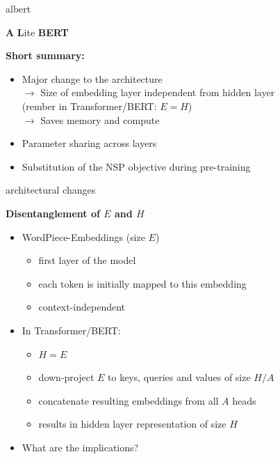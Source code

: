 
\begin{frame}{albert}

\vfill

\textbf{A} \textbf{L}ite \textbf{BERT} \\ \medskip\medskip

\textbf{Short summary:}

	\begin{itemize}
		\item Major change to the architecture \\
					$\to$ Size of embedding layer independent from hidden layer\\
					(rember in Transformer/BERT: $E = H$)\\
					$\to$ Saves memory and compute
		\item Parameter sharing across layers	
		\item Substitution of the NSP objective during pre-training
	\end{itemize}
	
\vfill

\end{frame}

\begin{frame}{architectural changes}

\vfill

	\textbf{Disentanglement of $E$ and $H$}

	\begin{itemize}
		\item	WordPiece-Embeddings (size $E$) 
			\begin{itemize}
				\item first layer of the model
				\item each token is initially mapped to this embedding
				\item context-independent
			\end{itemize}
		\item In Transformer/BERT: 
			\begin{itemize}
				\item $H = E$
				\item down-project $E$ to keys, queries and values of size $H/A$
				\item concatenate resulting embeddings from all $A$ heads
				\item results in hidden layer representation of size $H$
			\end{itemize}
		\item \ques What are the implications?
	\end{itemize}

\vfill

\end{frame}

